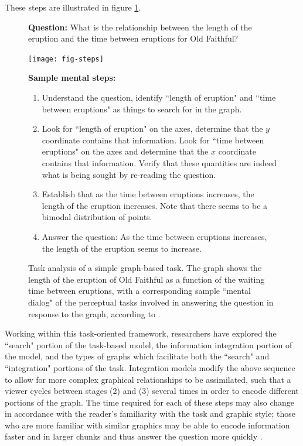 \documentclass[11pt]{isuthesis}\usepackage[]{graphicx}\usepackage[]{color}
\begin{document}
These steps are illustrated in figure \ref{fig:taskgraph}. 


\begin{figure}[htbp]
\textbf{Question:} What is the relationship between the length of the eruption and the time between eruptions for Old Faithful?
\begin{center}
\begin{minipage}[c]{.45\textwidth}
\texttt{[image: fig-steps]}
\end{minipage}
\begin{minipage}[c]{.54\textwidth}
\textbf{Sample mental steps: }
{\small
\begin{enumerate}
\item Understand the question, identify ``length of eruption" and ``time between eruptions" as things to search for in the graph.
\item Look for ``length of eruption" on the axes, determine that the $y$ coordinate contains that information. Look for ``time between eruptions" on the axes and determine that the $x$ coordinate contains that information. Verify that these quantities are indeed what is being sought by re-reading the question. 
\item Establish that as the time between eruptions increases, the length of the eruption increases. Note that there seems to be a bimodal distribution of points. 
\item Answer the question: As the time between eruptions increases, the length of the eruption seems to increase.
\end{enumerate}
}
\end{minipage}
\end{center}
\caption[Task analysis of a simple graph]{Task analysis of a simple graph-based task. The graph shows the length of the eruption of Old Faithful as a function of the waiting time between eruptions, with a corresponding sample ``mental dialog" of the perceptual tasks involved in answering the question in response to the graph, according to \protect\citet{shah2005cambridge}. }\label{fig:taskgraph}
\end{figure}

Working within this task-oriented framework, researchers have explored the ``search" portion of the task-based model, the information integration portion of the model, and the types of graphs which facilitate both the ``search" and ``integration" portions of the task. Integration models modify the above sequence to allow for more complex graphical relationships to be assimilated, such that a viewer cycles between stages (2) and (3) several times in order to encode different portions of the graph. The time required for each of these steps may also change in accordance with the reader's familiarity with the task and graphic style; those who are more familiar with similar graphics may be able to encode information faster and in larger chunks and thus answer the question more quickly \citep{carpenter1998model}. 
\end{document}

